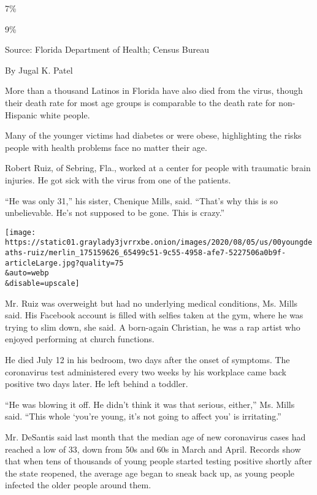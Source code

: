 7\%

9\%

Source: Florida Department of Health; Census Bureau

By Jugal K. Patel

More than a thousand Latinos in Florida have also died from the virus,
though their death rate for most age groups is comparable to the death
rate for non-Hispanic white people.

Many of the younger victims had diabetes or were obese, highlighting the
risks people with health problems face no matter their age.

Robert Ruiz, of Sebring, Fla., worked at a center for people with
traumatic brain injuries. He got sick with the virus from one of the
patients.

``He was only 31,'' his sister, Chenique Mills, said. ``That's why this
is so unbelievable. He's not supposed to be gone. This is crazy.''

\texttt{[image: https://static01.graylady3jvrrxbe.onion/images/2020/08/05/us/00youngdeaths-ruiz/merlin\_175159626\_65499c51-9c55-4958-afe7-5227506a0b9f-articleLarge.jpg?quality=75\\\&auto=webp\\\&disable=upscale]}

Mr. Ruiz was overweight but had no underlying medical conditions, Ms.
Mills said. His Facebook account is filled with selfies taken at the
gym, where he was trying to slim down, she said. A born-again Christian,
he was a rap artist who enjoyed performing at church functions.

He died July 12 in his bedroom, two days after the onset of symptoms.
The coronavirus test administered every two weeks by his workplace came
back positive two days later. He left behind a toddler.

``He was blowing it off. He didn't think it was that serious, either,''
Ms. Mills said. ``This whole `you're young, it's not going to affect
you' is irritating.''

Mr. DeSantis said last month that the median age of new coronavirus
cases had reached a low of 33, down from 50s and 60s in March and April.
Records show that when tens of thousands of young people started testing
positive shortly after the state reopened, the average age began to
sneak back up, as young people infected the older people around them.

\href{https://www.nytimes3xbfgragh.onion/news-event/coronavirus?action=click\&pgtype=Article\&state=default\&region=MAIN_CONTENT_3\&context=storylines_faq}{}

